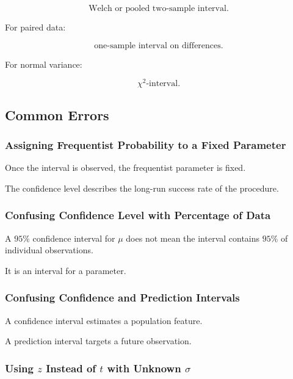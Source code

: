 \[
\boxed{
\text{Welch or pooled two-sample interval}.
}
\]

For paired data:

\[
\boxed{
\text{one-sample interval on differences}.
}
\]

For normal variance:

\[
\boxed{
\chi^2\text{-interval}.
}
\]

\subsection{Common Errors}
\label{subsec:confidence-interval-common-errors}

\subsubsection{Assigning Frequentist Probability to a Fixed Parameter}

Once the interval is observed, the frequentist parameter is fixed.

The confidence level describes the long-run success rate of the
procedure.

\subsubsection{Confusing Confidence Level with Percentage of Data}

A \(95\%\) confidence interval for \(\mu\) does not mean the interval
contains \(95\%\) of individual observations.

It is an interval for a parameter.

\subsubsection{Confusing Confidence and Prediction Intervals}

A confidence interval estimates a population feature.

A prediction interval targets a future observation.

\subsubsection{Using \(z\) Instead of \(t\) with Unknown \(\sigma\)}

